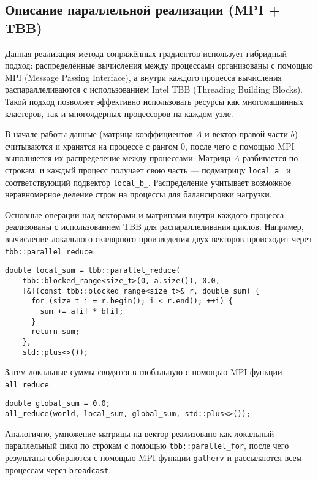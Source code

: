 \documentclass[12pt]{article}
\begin{document}
\subsection{Описание параллельной реализации (MPI + TBB)}

\hspace*{1.35em}Данная реализация метода сопряжённых градиентов использует гибридный подход: распределённые вычисления между процессами организованы с помощью MPI (Message Passing Interface), а внутри каждого процесса вычисления распараллеливаются с использованием Intel TBB (Threading Building Blocks). Такой подход позволяет эффективно использовать ресурсы как многомашинных кластеров, так и многоядерных процессоров на каждом узле.

В начале работы данные (матрица коэффициентов \( A \) и вектор правой части \( b \)) считываются и хранятся на процессе с рангом 0, после чего с помощью MPI выполняется их распределение между процессами. Матрица \( A \) разбивается по строкам, и каждый процесс получает свою часть — подматрицу \texttt{local\_a\_} и соответствующий подвектор \texttt{local\_b\_}. Распределение учитывает возможное неравномерное деление строк на процессы для балансировки нагрузки.

Основные операции над векторами и матрицами внутри каждого процесса реализованы с использованием TBB для распараллеливания циклов. Например, вычисление локального скалярного произведения двух векторов происходит через \texttt{tbb::parallel\_reduce}:

\begin{verbatim}
double local_sum = tbb::parallel_reduce(
    tbb::blocked_range<size_t>(0, a.size()), 0.0,
    [&](const tbb::blocked_range<size_t>& r, double sum) {
      for (size_t i = r.begin(); i < r.end(); ++i) {
        sum += a[i] * b[i];
      }
      return sum;
    },
    std::plus<>());
\end{verbatim}

Затем локальные суммы сводятся в глобальную с помощью MPI-функции \texttt{all\_reduce}:

\begin{verbatim}
double global_sum = 0.0;
all_reduce(world, local_sum, global_sum, std::plus<>());
\end{verbatim}

Аналогично, умножение матрицы на вектор реализовано как локальный параллельный цикл по строкам с помощью \texttt{tbb::parallel\_for}, после чего результаты собираются с помощью MPI-функции \texttt{gatherv} и рассылаются всем процессам через \texttt{broadcast}.
\end{document}
